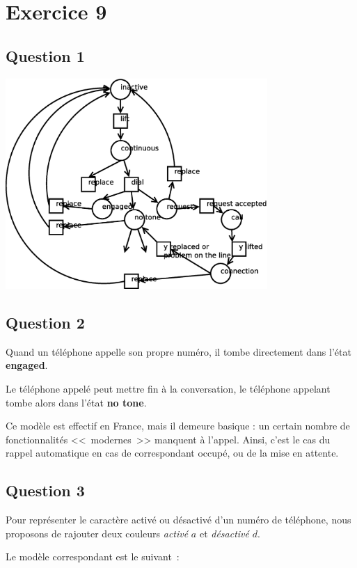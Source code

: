 \section{Exercice 9}
\subsection{Question 1}

\begin{center}
\includegraphics[height = 8cm]{exo9_1.eps}
\end{center}

\subsection{Question 2}

Quand un téléphone appelle son propre numéro, il tombe directement dans l'état \textbf{engaged}.

Le téléphone appelé peut mettre fin à la conversation, le téléphone
appelant tombe alors dans l'état \textbf{no tone}.

Ce modèle est effectif en France, mais il demeure basique : un certain
nombre de fonctionnalités <<~modernes~>> manquent à l'appel. Ainsi,
c'est le cas du rappel automatique en cas de correspondant occupé, ou
de la mise en attente.

\subsection{Question 3}

Pour représenter le caractère activé ou désactivé d'un numéro de
téléphone, nous proposons de rajouter deux couleurs \textit{activé}
$a$ et \textit{désactivé} $d$.

Le modèle correspondant est le suivant~:


